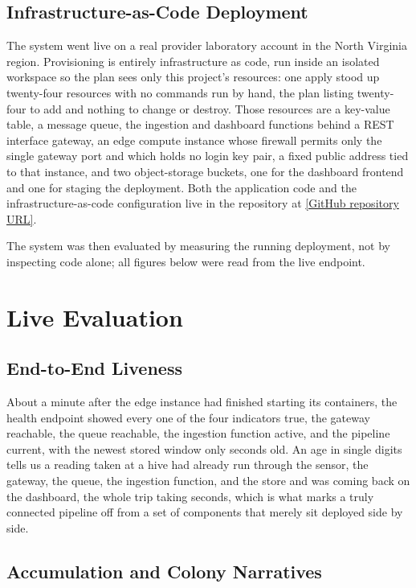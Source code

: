 \documentclass[conference]{IEEEtran}
\begin{document}
\subsection{Infrastructure-as-Code Deployment}

The system went live on a real provider laboratory account in the North Virginia region. Provisioning is entirely infrastructure as code, run inside an isolated workspace so the plan sees only this project's resources: one apply stood up twenty-four resources with no commands run by hand, the plan listing twenty-four to add and nothing to change or destroy. Those resources are a key-value table, a message queue, the ingestion and dashboard functions behind a REST interface gateway, an edge compute instance whose firewall permits only the single gateway port and which holds no login key pair, a fixed public address tied to that instance, and two object-storage buckets, one for the dashboard frontend and one for staging the deployment. Both the application code and the infrastructure-as-code configuration live in the repository at \href{[GitHub repository URL]}{[GitHub repository URL]}.

The system was then evaluated by measuring the running deployment, not by inspecting code alone; all figures below were read from the live endpoint.

\section{Live Evaluation}

\subsection{End-to-End Liveness}

About a minute after the edge instance had finished starting its containers, the health endpoint showed every one of the four indicators true, the gateway reachable, the queue reachable, the ingestion function active, and the pipeline current, with the newest stored window only seconds old. An age in single digits tells us a reading taken at a hive had already run through the sensor, the gateway, the queue, the ingestion function, and the store and was coming back on the dashboard, the whole trip taking seconds, which is what marks a truly connected pipeline off from a set of components that merely sit deployed side by side.

\subsection{Accumulation and Colony Narratives}
\end{document}
